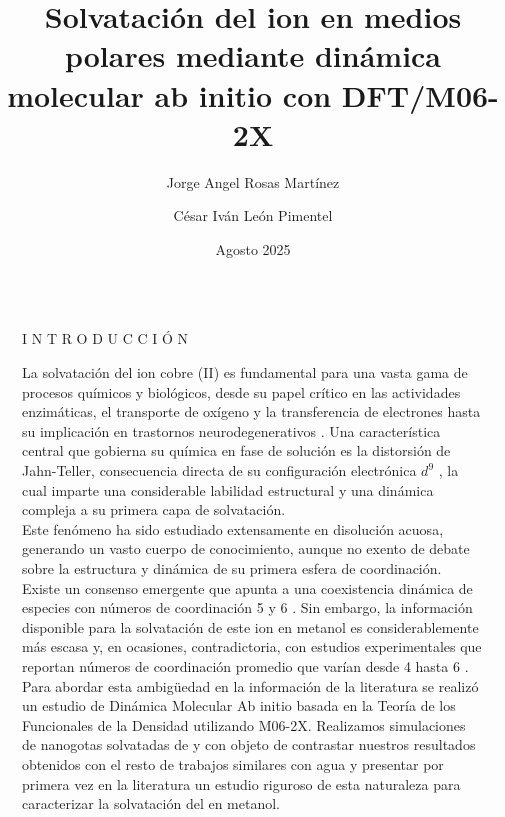 \documentclass[final]{beamer}
\title{Solvatación del ion \ce{Cu^{2+}} en medios polares mediante dinámica molecular ab initio con DFT/M06-2X}
\author{Jorge Angel Rosas Martínez \inst{1} \and César Iván León Pimentel \inst{2}}
\institute[shortinst]{\inst{1} Facultad de Química, UNAM \inst{2} Depto. de Matemáticas, Facultad de Química, UNAM}
\date{Agosto 2025}
\newlength{\sepwidth}
\newlength{\colwidth}
\newcommand{\separatorcolumn}{\begin{column}{\sepwidth}\end{column}}
\begin{document}
	
\begin{frame}[t]

	
	\begin{columns}[t]
		\separatorcolumn

		\begin{column}{\colwidth}
			\begin{block}{I N T R O D U C C I Ó N}

				\justifying

				La solvatación del ion cobre (II)  es fundamental para una vasta gama de procesos químicos y biológicos, desde su papel crítico en las actividades enzimáticas, el transporte de oxígeno y la transferencia de electrones \cite{Wa-2023-01, Wa-2024-03} hasta su implicación en trastornos neurodegenerativos \cite{Cu-2014-02}. Una característica central que gobierna su química en fase de solución es la distorsión de Jahn-Teller, consecuencia directa de su configuración electrónica $d^9$ \cite{Cu-2019-01}, la cual imparte una considerable labilidad estructural y una dinámica compleja a su primera capa de solvatación.\\ Este fenómeno ha sido estudiado extensamente en disolución acuosa, generando un vasto cuerpo de conocimiento, aunque no exento de debate sobre la estructura y dinámica de su primera esfera de coordinación. Existe un consenso emergente que apunta a una coexistencia dinámica de especies con números de coordinación 5 y 6 \cite{Wa-2023-01}. Sin embargo, la información disponible para la solvatación de este ion en metanol es considerablemente más escasa y, en ocasiones, contradictoria, con estudios experimentales que reportan números de coordinación promedio que varían desde 4 hasta 6 \cite{Me-2025-01}. \\ Para abordar esta ambigüedad en la información de la literatura se realizó un estudio de Dinámica Molecular Ab initio basada en la Teoría de los Funcionales de la Densidad utilizando M06-2X. Realizamos simulaciones de nanogotas solvatadas de  y  con objeto de contrastar nuestros resultados obtenidos con el resto de trabajos similares con agua y presentar por primera vez en la literatura un estudio riguroso de esta naturaleza para caracterizar la solvatación del  en metanol.


			\end{block}

		\end{column}

		\separatorcolumn


\end{columns}
\end{frame}
\end{document}
